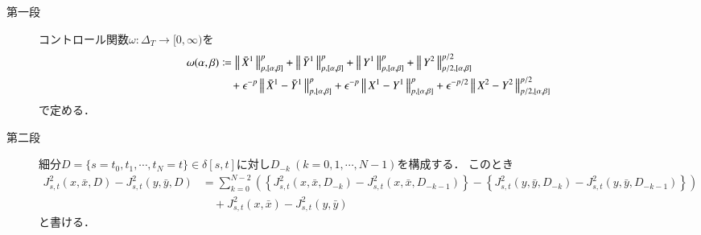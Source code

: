 	\begin{prf}\mbox{}
		\begin{description}
			\item[第一段] コントロール関数$\omega:\Delta_T \longrightarrow [0,\infty)$を
				\begin{align}
					\omega(\alpha,\beta) &\coloneqq
					\left\|\, \bar{X}^1\, \right\|_{p,[\alpha,\beta]}^p + \left\|\, \bar{Y}^1\, \right\|_{p,[\alpha,\beta]}^p + \left\|\, Y^1\, \right\|_{p,[\alpha,\beta]}^p + \left\|\, Y^2\, \right\|_{p/2,[\alpha,\beta]}^{p/2} \\
					&\quad + \epsilon^{-p} \left\|\, \bar{X}^1 - \bar{Y}^1\, \right\|_{p,[\alpha,\beta]}^p + \epsilon^{-p} \left\|\, X^1 - Y^1\, \right\|_{p,[\alpha,\beta]}^p + \epsilon^{-p/2} \left\|\, X^2 - Y^2\, \right\|_{p/2,[\alpha,\beta]}^{p/2}
				\end{align}
				で定める．
				
			\item[第二段]
				細分$D = \{s=t_0,t_1,\cdots,t_N=t\} \in \delta[s,t]$に対し$D_{-k}\ (k=0,1,\cdots,N-1)$を構成する．
				このとき
				\begin{align}
					J^2_{s,t}(x,\bar{x},D) - J^2_{s,t}(y,\bar{y},D)
					&= \sum_{k=0}^{N-2} \left( \left\{ J^2_{s,t}(x,\bar{x},D_{-k}) - J^2_{s,t}(x,\bar{x},D_{-k-1}) \right\}
						- \left\{ J^2_{s,t}(y,\bar{y},D_{-k}) - J^2_{s,t}(y,\bar{y},D_{-k-1}) \right\} \right) \\
					&\quad + J^2_{s,t}(x,\bar{x}) - J^2_{s,t}(y,\bar{y})
				\end{align}
				と書ける．
				

\end{description}
\end{prf}
